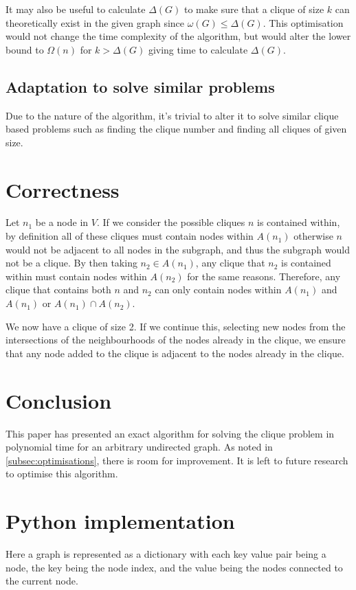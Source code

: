 \documentclass[11pt]{article}
\begin{document}
It may also be useful to calculate $\Delta(G)$ to make sure that a clique of size $k$ can theoretically exist in the given graph since $\omega(G)\leq\Delta(G)$. This optimisation would not change the time complexity of the algorithm, but would alter the lower bound to $\Omega(n)$ for $k>\Delta(G)$ giving time to calculate $\Delta(G)$.

\subsection{Adaptation to solve similar problems}
Due to the nature of the algorithm, it's trivial to alter it to solve similar clique based problems such as finding the clique number and finding all cliques of given size.

\section{Correctness}

Let $n_1$ be a node in $V$. If we consider the possible cliques $n$ is contained within, by definition all of these cliques must contain nodes within $A(n_1)$ otherwise $n$ would not be adjacent to all nodes in the subgraph, and thus the subgraph would not be a clique. By then taking $n_2\in A(n_1)$, any clique that $n_2$ is contained within must contain nodes within $A(n_2)$ for the same reasons. Therefore, any clique that contains both $n$ and $n_2$ can only contain nodes within $A(n_1)$ and $A(n_1)$ or $A(n_1)\cap A(n_2)$.

We now have a clique of size 2. If we continue this, selecting new nodes from the intersections of the neighbourhoods of the nodes already in the clique, we ensure that any node added to the clique is adjacent to the nodes already in the clique.

\section{Conclusion}

This paper has presented an exact algorithm for solving the clique problem in polynomial time for an arbitrary undirected graph. As noted in \cref{subsec:optimisations}, there is room for improvement. It is left to future research to optimise this algorithm.

\appendix
\section{Python implementation}
\label{apdx:a}
Here a graph is represented as a dictionary with each key value pair being a node, the key being the node index, and the value being the nodes connected to the current node.




\end{document}
